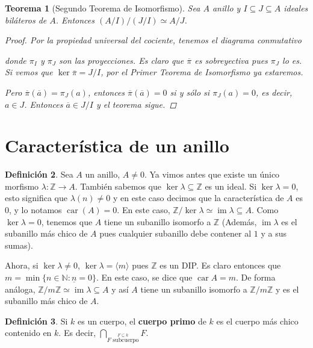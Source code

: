 \documentclass[12pt]{book}
\newtheorem{teo}{Teorema}[section]
\theoremstyle{definition}
\newtheorem{defn}[teo]{Definición}
\newcommand{\ZZ}{\mathbb{Z}}      %
\newcommand{\NN}{\mathbb{N}}
\DeclareMathOperator{\im}{im}
\DeclareMathOperator{\car}{car}
\begin{document}
\begin{teo}[Segundo Teorema de Isomorfismo]
Sea $A$ anillo y $I\subseteq J\subseteq A$ ideales biláteros de $A$. Entonces $(A/I)/(J/I) \simeq A/J$.
\begin{proof}
Por la propiedad universal del cociente, tenemos el diagrama conmutativo  donde $\pi_I$ y $\pi_J$ son las proyecciones. Es claro que $\overline{\pi}$ es sobreyectiva pues $\pi_J$ lo es. Si vemos que $\ker \overline{\pi} = J/I$, por el Primer Teorema de Isomorfismo ya estaremos.

Pero $\overline{\pi}(\overline{a})=\pi_J(a)$, entonces $\overline{\pi}(\overline{a})=0$ si y sólo si $\pi_J(a)=0$, es decir, $a\in J$. Entonces $\overline{a}\in J/I$ y el teorema sigue.

\end{proof}
\end{teo}

\section{Característica de un anillo}
\begin{defn}
Sea $A$ un anillo, $A\neq 0$. Ya vimos antes que existe un único morfismo $\lambda : \ZZ\to A$. También sabemos que $\ker \lambda\subseteq \ZZ$ es un ideal. Si $\ker \lambda = 0$, esto significa que $\lambda (n) \neq 0$ y en este caso decimos que la característica de $A$ es $0$, y lo notamos $\car (A)=0$. En este caso, $\ZZ/\ker \lambda \simeq \im \lambda\subseteq A$. Como $\ker\lambda = 0$, tenemos que $A$ tiene un subanillo isomorfo a $\ZZ$ (Además, $\im \lambda$ es el subanillo más chico de $A$ pues cualquier subanillo debe contener al $1$ y a sus sumas).

Ahora, si $\ker\lambda\neq 0$, $\ker\lambda = \langle m\rangle$ pues $\ZZ$ es un DIP. Es claro entonces que $m=\min \{n\in \NN : \underline{n}=0\}$. En este caso, se dice que $\car A = m$. De forma análoga, $\ZZ/m\ZZ\simeq \im\lambda\subseteq A$ y así $A$ tiene un subanillo isomorfo a $\ZZ/m\ZZ$ y es el subanillo más chico de $A$.
\end{defn}
\begin{defn}
Si $k$ es un cuerpo, el \textbf{cuerpo primo} de $k$ es el cuerpo más chico contenido en $k$. Es decir, $\displaystyle\bigcap_{\stackrel{F\subseteq k}{F \text{ subcuerpo}}} F$.
\end{defn}
\end{document}
